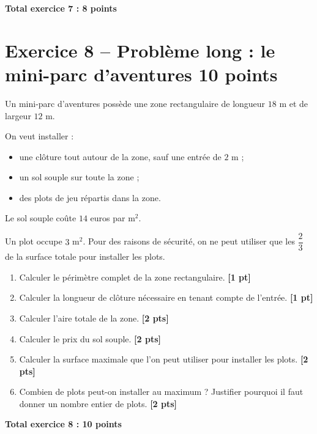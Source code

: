\documentclass[11pt,a4paper]{article}
\newcommand{\pts}[1]{\hfill \textbf{[#1 pt]}}
\newcommand{\ptss}[1]{\hfill \textbf{[#1 pts]}}
\begin{document}
\hfill \textbf{Total exercice 7 : 8 points}

\section*{Exercice 8 -- Problème long : le mini-parc d'aventures \hfill 10 points}

Un mini-parc d'aventures possède une zone rectangulaire de longueur $18$ m et de largeur $12$ m.

On veut installer :
\begin{itemize}
    \item une clôture tout autour de la zone, sauf une entrée de $2$ m ;
    \item un sol souple sur toute la zone ;
    \item des plots de jeu répartis dans la zone.
\end{itemize}

Le sol souple coûte $14$ euros par m$^2$.

Un plot occupe $3$ m$^2$.
Pour des raisons de sécurité, on ne peut utiliser que les $\dfrac{2}{3}$ de la surface totale pour installer les plots.

\begin{enumerate}[label=\textbf{\arabic*)}]

\item Calculer le périmètre complet de la zone rectangulaire. \pts{1}

\item Calculer la longueur de clôture nécessaire en tenant compte de l'entrée. \pts{1}

\item Calculer l'aire totale de la zone. \ptss{2}

\item Calculer le prix du sol souple. \ptss{2}

\item Calculer la surface maximale que l'on peut utiliser pour installer les plots. \ptss{2}

\item Combien de plots peut-on installer au maximum ? Justifier pourquoi il faut donner un nombre entier de plots. \ptss{2}

\end{enumerate}

\hfill \textbf{Total exercice 8 : 10 points}
\end{document}
